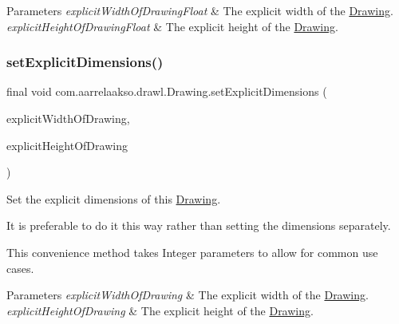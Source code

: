 \begin{DoxyParams}{Parameters}
{\em explicit\+Width\+Of\+Drawing\+Float} & The explicit width of the \hyperlink{classcom_1_1aarrelaakso_1_1drawl_1_1_drawing}{Drawing}. \\
\hline
{\em explicit\+Height\+Of\+Drawing\+Float} & The explicit height of the \hyperlink{classcom_1_1aarrelaakso_1_1drawl_1_1_drawing}{Drawing}. \\
\hline
\end{DoxyParams}
\mbox{\label{classcom_1_1aarrelaakso_1_1drawl_1_1_drawing_a79952c781df3b19936f0f47e2810951d}} 
\subsubsection{\texorpdfstring{set\+Explicit\+Dimensions()}{setExplicitDimensions()}\hspace{0.1cm}{\footnotesize\ttfamily [2/2]}}
{\footnotesize\ttfamily final void com.\+aarrelaakso.\+drawl.\+Drawing.\+set\+Explicit\+Dimensions (\begin{DoxyParamCaption}\item[{@Not\+Null final Integer}]{explicit\+Width\+Of\+Drawing,  }\item[{@Not\+Null final Integer}]{explicit\+Height\+Of\+Drawing }\end{DoxyParamCaption})}



Set the explicit dimensions of this \hyperlink{classcom_1_1aarrelaakso_1_1drawl_1_1_drawing}{Drawing}. 

It is preferable to do it this way rather than setting the dimensions separately. 

This convenience method takes Integer parameters to allow for common use cases.


\begin{DoxyParams}{Parameters}
{\em explicit\+Width\+Of\+Drawing} & The explicit width of the \hyperlink{classcom_1_1aarrelaakso_1_1drawl_1_1_drawing}{Drawing}. \\
\hline
{\em explicit\+Height\+Of\+Drawing} & The explicit height of the \hyperlink{classcom_1_1aarrelaakso_1_1drawl_1_1_drawing}{Drawing}. \\
\hline
\end{DoxyParams}
\mbox{\label{classcom_1_1aarrelaakso_1_1drawl_1_1_drawing_a115e6b8aab01c3d54c68af9cdc67ed11}} 

